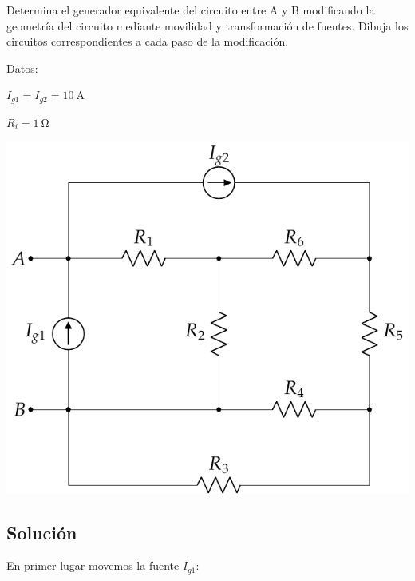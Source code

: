 \documentclass[12pt]{article}
\begin{document}
\begin{minipage}{0.5\textwidth}

  Determina el generador equivalente del circuito entre A y B modificando la geometría del circuito mediante movilidad y transformación de fuentes. Dibuja los circuitos correspondientes a cada paso de la modificación.

  Datos:

  $I_{g1} = I_{g2} = \SI{10}{\ampere}$

  $R_{i}= \SI{1}{\ohm}$%
\end{minipage}
\begin{minipage}{0.5\textwidth}
\includegraphics[width=\textwidth]{figs/movilidad.pdf}
\end{minipage}

\subsection*{Solución}

En primer lugar movemos la fuente $I_{g1}$:
\end{document}
